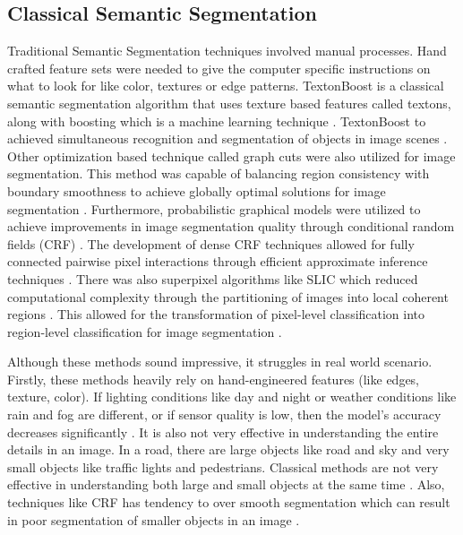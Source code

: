\documentclass[10pt,journal,compsoc]{IEEEtran}
\begin{document}
\subsection{Classical Semantic Segmentation}
Traditional Semantic Segmentation techniques involved manual processes. Hand crafted feature sets were needed to give the computer specific instructions on what to look for like color, textures or edge patterns. TextonBoost is a classical semantic segmentation algorithm that uses texture based features called textons, along with boosting which is a machine learning technique \cite{Shotton2009}. TextonBoost to achieved simultaneous recognition and segmentation of objects in image scenes \cite{Shotton2009}. Other optimization based technique called graph cuts were also utilized for image segmentation. This method was capable of balancing region consistency with boundary smoothness to achieve globally optimal solutions for image segmentation \cite{937505}. Furthermore, probabilistic graphical models were utilized to achieve improvements in image segmentation quality through conditional random fields (CRF) \cite{krahenbuhl2012efficientinferencefullyconnected}. The development of dense CRF techniques allowed for fully connected pairwise pixel interactions through efficient approximate inference techniques \cite{krahenbuhl2012efficientinferencefullyconnected}. There was also superpixel algorithms like SLIC which reduced computational complexity through the partitioning of images into local coherent regions \cite{6205760}. This allowed for the transformation of pixel-level classification into region-level classification for image segmentation \cite{6205760}.

Although these methods sound impressive, it struggles in real world scenario. Firstly, these methods heavily rely on hand-engineered features (like edges, texture, color). If lighting conditions like day and night or weather conditions like rain and fog are different, or if sensor quality is low, then the model’s accuracy decreases significantly \cite{Shotton2009}. It is also not very effective in understanding the entire details in an image. In a road, there are large objects like road and sky and very small objects like traffic lights and pedestrians. Classical methods are not very effective in understanding both large and small objects at the same time \cite{Cordts_2016_CVPR}. Also, techniques like CRF has tendency to over smooth segmentation which can result in poor segmentation of smaller objects in an image \cite{Cordts_2016_CVPR}.
\end{document}
